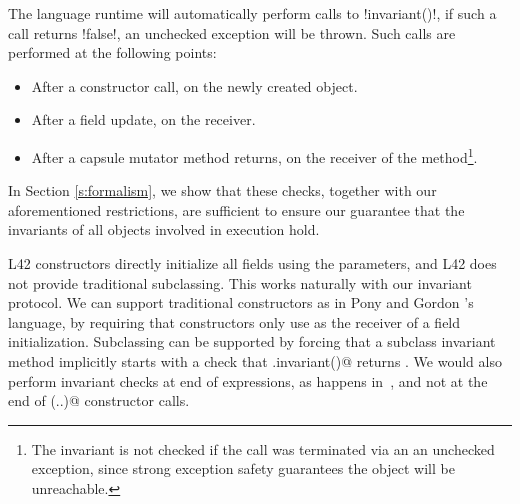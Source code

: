



The language runtime will automatically perform calls to \Q!invariant()!, if such a call returns \Q!false!, an unchecked exception will be thrown. Such calls are performed at the following points:
\begin{itemize}
	\item After a constructor call, on the newly created object.
	\item After a field update, on the receiver.
	\item After a capsule mutator method returns, on the receiver of the method\footnote{The invariant is not checked if the call was terminated via an an unchecked exception, since strong exception safety guarantees the object will be unreachable.}.
\end{itemize}
\noindent In Section \ref{s:formalism}, we show that these checks, together with our aforementioned restrictions, are sufficient to ensure our guarantee that the invariants of all objects involved in execution hold. %

L42 constructors directly initialize all fields using the parameters, and L42 does not provide traditional subclassing.
This works naturally with our invariant protocol.
We can support traditional constructors as in Pony and Gordon \etal's language, 
by requiring that constructors only use \Q@this@ as the receiver of a field initialization.
Subclassing can be supported by forcing that a subclass invariant method implicitly starts with a check that \Q@super.invariant()@ returns \Q@true@. We would also perform invariant checks at end of \Q@new@ expressions, as happens in~\cite{feldman2006jose}, and not at the end of \Q@super(..)@ constructor calls.
